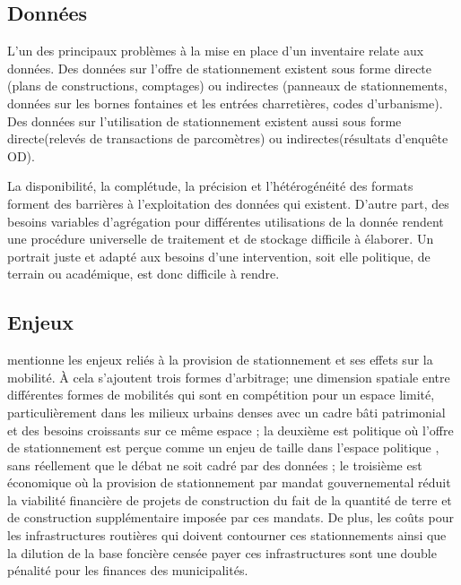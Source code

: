 \subsection{Données}

L'un des principaux problèmes à la mise en place d'un inventaire relate aux données. Des données sur l'offre de stationnement existent sous forme directe (plans de constructions, comptages) ou indirectes (panneaux de stationnements, données sur les bornes fontaines et les entrées charretières, codes d'urbanisme). Des données sur l'utilisation de stationnement existent aussi sous forme directe(relevés de transactions de parcomètres) ou indirectes(résultats d'enquête OD).\par
La disponibilité, la complétude, la précision et l'hétérogénéité des formats forment des barrières à l'exploitation des données qui existent. D'autre part, des besoins variables d'agrégation pour différentes utilisations de la donnée rendent une procédure universelle de traitement et de stockage difficile à élaborer. Un portrait juste et adapté aux besoins d'une intervention, soit elle politique, de terrain ou académique, est donc difficile à rendre.

\subsection{Enjeux}

\textcite{bourdeau_methodologie_2014} mentionne les enjeux reliés à la provision de  stationnement et ses effets sur la mobilité. À cela s'ajoutent trois formes d'arbitrage; une dimension spatiale entre différentes formes de mobilités qui sont en compétition pour un espace limité, particulièrement dans les milieux urbains denses avec un cadre bâti patrimonial et des besoins croissants sur ce même espace ; la deuxième est politique où l'offre de stationnement est perçue comme un enjeu de taille dans l'espace politique \parencite{mattioli_political_2020,button_political_2006}, sans réellement que le débat ne soit cadré par des données ; le troisième est économique où la provision de stationnement par mandat gouvernemental réduit la viabilité financière de projets de construction du fait de la quantité de terre et de construction supplémentaire imposée par ces mandats. De plus, les coûts pour les infrastructures routières qui doivent contourner ces stationnements  \fg{} ainsi que la dilution de la base foncière censée payer ces infrastructures sont une double pénalité pour les finances des municipalités. 


